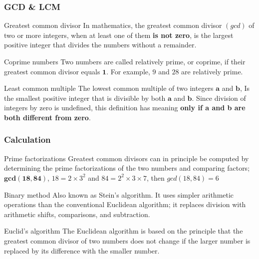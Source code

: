 \documentclass{beamer}
\begin{document}
\begin{frame}
\frametitle{GCD \& LCM}
 \begin{block}{Greatest common divisor}
In mathematics, the greatest common divisor $(gcd)$ of two or more integers, when at least one of them \textbf{is not zero}, is the largest positive integer that divides the numbers without a remainder.
\end{block}
 \begin{block}{Coprime numbers}
Two numbers are called relatively prime, or coprime, if their greatest common divisor equals $\mathbf{1}$. For example, $9$ and $28$ are relatively prime.
\end{block}
 \begin{block}{Least common multiple}
The lowest common multiple of two integers  $\mathbf{a}$ and $\mathbf{b}$, Is the smallest positive integer that is divisible by both $\mathbf{a}$ and $\mathbf{b}$. Since division of integers by zero is undefined, this definition has meaning \textbf{only if a and b are both different from zero}.
\end{block}
\end{frame}

\begin{frame}
\frametitle{Calculation }
  \begin{block}{Prime factorizations}
Greatest common divisors can in principle be computed by determining the prime factorizations of the two numbers and comparing factors;  $\mathbf{gcd(18, 84)}$, $18 = 2 \times 3^2$ and $84 = 2^2 \times 3 \times 7$, then $gcd(18,84) = 6$ 
	\end{block}
  \begin{block}{Binary method}
Also known as Stein's algorithm. It uses  simpler arithmetic operations than the conventional Euclidean algorithm; it replaces division with arithmetic shifts, comparisons, and subtraction.
	\end{block}
  \begin{block}{Euclid's algorithm}
The Euclidean algorithm is based on the principle that the greatest common divisor of two numbers does not change if the larger number is replaced by its difference with the smaller number.
	\end{block}
\end{frame}
\end{document}
